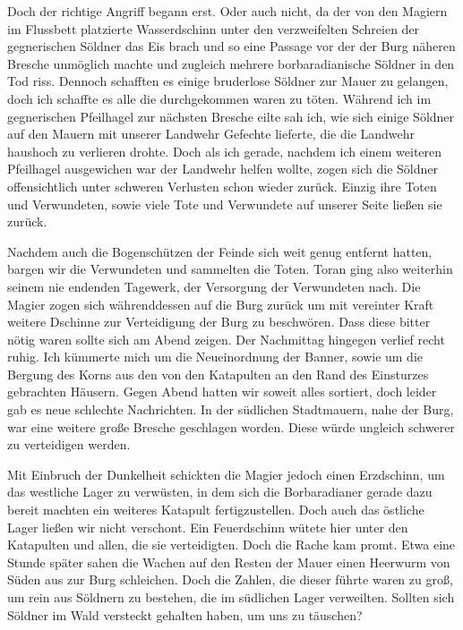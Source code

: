 Doch der richtige Angriff begann erst. Oder auch nicht, da der von den Magiern im Flussbett platzierte Wasserdschinn unter den verzweifelten Schreien der gegnerischen Söldner das Eis brach und so eine Passage vor der der Burg näheren Bresche unmöglich machte und zugleich mehrere borbaradianische Söldner in den Tod riss. Dennoch schafften es einige bruderlose Söldner zur Mauer zu gelangen, doch ich schaffte es alle die durchgekommen waren zu töten. Während ich im gegnerischen Pfeilhagel zur nächsten Bresche eilte sah ich, wie sich einige Söldner auf den Mauern mit unserer Landwehr Gefechte lieferte, die die Landwehr haushoch zu verlieren drohte. Doch als ich gerade, nachdem ich einem weiteren Pfeilhagel ausgewichen war der Landwehr helfen wollte, zogen sich die Söldner offensichtlich unter schweren Verlusten schon wieder zurück. Einzig ihre Toten und Verwundeten, sowie viele Tote und Verwundete auf unserer Seite ließen sie zurück.

Nachdem auch die Bogenschützen der Feinde sich weit genug entfernt hatten, bargen wir die Verwundeten und sammelten die Toten. Toran ging also weiterhin seinem nie endenden Tagewerk, der Versorgung der Verwundeten nach. Die Magier zogen sich währenddessen auf die Burg zurück um mit vereinter Kraft weitere Dschinne zur Verteidigung der Burg zu beschwören. Dass diese bitter nötig waren sollte sich am Abend zeigen. Der Nachmittag hingegen verlief recht ruhig. Ich kümmerte mich um die Neueinordnung der Banner, sowie um die Bergung des Korns aus den von den Katapulten an den Rand des Einsturzes gebrachten Häusern. Gegen Abend hatten wir soweit alles sortiert, doch leider gab es neue schlechte Nachrichten. In der südlichen Stadtmauern, nahe der Burg, war eine weitere große Bresche geschlagen worden. Diese würde ungleich schwerer zu verteidigen werden. 

Mit Einbruch der Dunkelheit schickten die Magier jedoch einen Erzdschinn, um das westliche Lager zu verwüsten, in dem sich die Borbaradianer gerade dazu bereit machten ein weiteres Katapult fertigzustellen. Doch auch das östliche Lager ließen wir nicht verschont. Ein Feuerdschinn wütete hier unter den Katapulten und allen, die sie verteidigten. Doch die Rache kam promt. Etwa eine Stunde später sahen die Wachen auf den Resten der Mauer einen Heerwurm von Süden aus zur Burg schleichen. Doch die Zahlen, die dieser führte waren zu groß, um rein aus Söldnern zu bestehen, die im südlichen Lager verweilten. Sollten sich Söldner im Wald versteckt gehalten haben, um uns zu täuschen?

